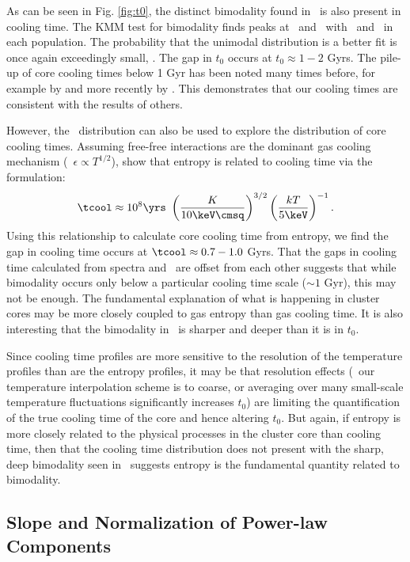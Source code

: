 \documentclass{emulateapj}
\begin{document}
As can be seen in Fig. \ref{fig:t0}, the distinct bimodality found in
\kna\ is also present in cooling time. The KMM test for bimodality
finds peaks at \tckmma\ and \tckmmb\ with \tckmmc\ and \tckmmd\ in
each population. The probability that the unimodal distribution is a
better fit is once again exceedingly small, \tckmme. The gap in $t_0$
occurs at $t_0 \approx 1-2$ Gyrs. The pile-up of core cooling times
below 1 Gyr has been noted many times before, for example by
\cite{hu85} and more recently by \cite{dunn08}. This demonstrates that
our cooling times are consistent with the results of others.

However, the \kna\ distribution can also be used to explore the
distribution of core cooling times. Assuming free-free interactions
are the dominant gas cooling mechanism (\ie\ $\epsilon \propto
T^{1/2}$), \cite{radioquiet} show that entropy is related to cooling
time via the formulation:
\begin{equation}
\tcool \approx 10^8 \yrs\ \left(\frac{K}{10 \keV \cmsq}\right)^{3/2} \left(\frac{kT}{5 \keV}\right)^{-1}.
\end{equation}
Using this relationship to calculate core cooling time from entropy,
we find the gap in cooling time occurs at $\tcool \approx 0.7-1.0$
Gyrs. That the gaps in cooling time calculated from spectra and \kna\
are offset from each other suggests that while bimodality occurs only
below a particular cooling time scale ($\sim 1$ Gyr), this may not be
enough. The fundamental explanation of what is happening in cluster
cores may be more closely coupled to gas entropy than gas cooling
time. It is also interesting that the bimodality in \kna\ is sharper
and deeper than it is in $t_0$.

Since cooling time profiles are more sensitive to the resolution of
the temperature profiles than are the entropy profiles, it may be that
resolution effects (\eg\ our temperature interpolation scheme is to
coarse, or averaging over many small-scale temperature fluctuations
significantly increases $t_0$) are limiting the quantification of the
true cooling time of the core and hence altering $t_0$. But again, if
entropy is more closely related to the physical processes in the
cluster core than cooling time, then that the cooling time
distribution does not present with the sharp, deep bimodality seen in
\kna\ suggests entropy is the fundamental quantity related to
bimodality.

\subsection{Slope and Normalization of Power-law Components}
\label{sec:slopes}
\end{document}
